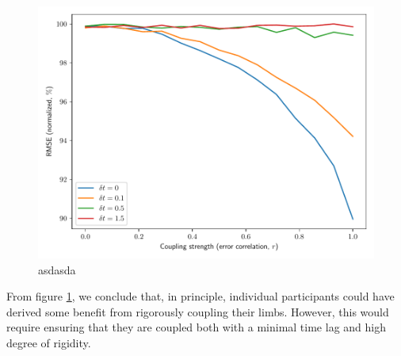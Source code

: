 \documentclass[11pt]{article}
\begin{document}
\begin{figure}
	\centering
	\includegraphics[width=1\linewidth]{correlation}
	\caption{asdasda}
	\label{fig:correlation}
\end{figure}

From figure \ref{fig:correlation}, we conclude that, in principle, individual participants could have derived some benefit from rigorously coupling their limbs. However, this would require ensuring that they are coupled both with a minimal time lag and high degree of rigidity. 



\end{document}
